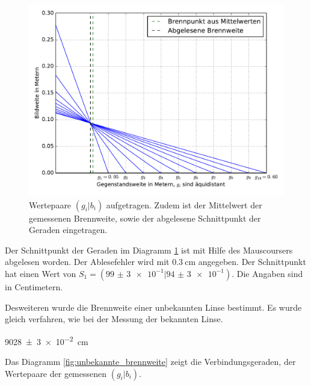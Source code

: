 \begin{figure}
  \centering
  \includegraphics[width=\textwidth]{Messung1_brennnweite_bekannt.pdf}
  \caption{Wertepaare $(g_i|b_i)$ aufgetragen. Zudem ist der Mittelwert der gemessenen Brennweite, sowie der abgelesene Schnittpunkt der Geraden eingetragen.}
  \label{fig:brennweite_bekannt}
\end{figure}

Der Schnittpunkt der Geraden im Diagramm \ref{fig:brennweite_bekannt}
ist mit Hilfe des Mauscoursers abgelesen worden. Der Ablesefehler wird mit
$\SI{0,3}{\centi\meter}$ angegeben.
Der Schnittpunkt hat einen Wert von $S_1 = (\num{99(3)e-1}|\num{94(3)e-1})$.
Die Angaben sind in Centimetern.

Desweiteren wurde die Brennweite einer unbekannten Linse bestimmt.
Es wurde gleich verfahren, wie bei der Messung der bekannten Linse.

\begin{description}
  \centering
  \item[$<f_2>\ua{gemessen}=$]\SI{9028(3)e-2}{\centi\meter}
\end{description}

Das Diagramm \ref{fig:unbekannte_brennweite} zeigt die Verbindungsgeraden,
der Wertepaare der gemessenen $(g_i|b_i)$.

